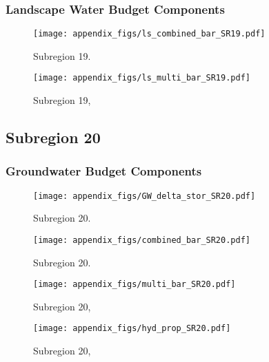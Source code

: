 \subsubsection{Landscape Water Budget Components}
\begin{figure}[ht]
\centerline{\texttt{[image: appendix\_figs/ls\_combined\_bar\_SR19.pdf]}}
\caption{\LSCombinedTextOne Subregion 19.\LSCombinedTextTwo}
\label{fig:LS_budget_SR19}
\end{figure}
\newpage

\begin{landscape}
\begin{figure}[ht]
\centerline{\texttt{[image: appendix\_figs/ls\_multi\_bar\_SR19.pdf]}}
\caption{\LSMultiTextOne Subregion 19,\LSMultiTextTwo}
\label{fig:multi_LS_budget_SR19}
\end{figure}
\newpage
\end{landscape}

\subsection{Subregion 20}
\subsubsection{Groundwater Budget Components}
\begin{figure}[h]
\centerline{\texttt{[image: appendix\_figs/GW\_delta\_stor\_SR20.pdf]}}
\caption{\GWBudgetText Subregion 20.}
\label{fig:delta_stor_SR20}
\end{figure}
\newpage

\begin{figure}[ht]
\centerline{\texttt{[image: appendix\_figs/combined\_bar\_SR20.pdf]}}
\caption{\GWCombinedTextOne Subregion 20.\GWCombinedTextTwo}
\label{fig:GW_budget_SR20}
\end{figure}
\newpage

\begin{landscape}
\begin{figure}[ht]
\centerline{\texttt{[image: appendix\_figs/multi\_bar\_SR20.pdf]}}
\caption{\GWMultiTextOne Subregion 20,\GWMultiTextTwo}
\label{fig:multi_GW_budget_SR20}
\end{figure}
\newpage

\begin{figure}[ht]
\centerline{\texttt{[image: appendix\_figs/hyd\_prop\_SR20.pdf]}}
\caption{\HydPropOne Subregion 20,\HydPropTwo}
\label{fig:hyd_prop_SR20}
\end{figure}
\newpage
\end{landscape}

